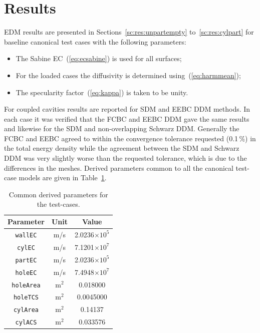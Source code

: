 \documentclass[a4paper]{article}
\numberwithin{equation}{section}
\newcounter{Table}
\begin{document}
\section[Results]{Results}
\label{sc:res}

EDM results are presented in Sections~\ref{sc:res:unpartempty} to~\ref{sc:res:cylpart} for baseline canonical 
test cases with the following parameters:
\begin{itemize}
 \item The Sabine EC~(\ref{eq:ecsabine}) is used for all surfaces;
 \item For the loaded cases the diffusivity is determined using~(\ref{eq:harmmean});
 \item The specularity factor~(\ref{eq:kappa}) is taken to be unity.
\end{itemize}
For coupled cavities results are reported for SDM and EEBC DDM methods. In each case it was verified
that the FCBC and EEBC DDM gave the same results and likewise for the SDM and non-overlapping Schwarz
DDM. Generally the FCBC and EEBC agreed to within the convergence tolerance requested (0.1\,\%) in the 
total energy density while the agreement between the SDM and Schwarz DDM was very slightly worse than
the requested tolerance, which is due to the differences in the meshes. Derived parameters common 
to all the canonical test-case models are given in Table~\ref{tb:derivparams}.

\begin{table}[ht]
\begin{center}
\begin{tabular}{|c|c|c|}
\hline
\textbf{Parameter}     &\textbf{Unit} &\textbf{Value}\\ 
\hline
\texttt{wallEC}        &m/s           &2.0236$\times 10^5$ \\
\texttt{cylEC}         &m/s           &7.1201$\times 10^7$ \\
\texttt{partEC}        &m/s           &2.0236$\times 10^5$ \\
\texttt{holeEC}        &m/s           &7.4948$\times 10^7$ \\
\texttt{holeArea}      &m$^2$         &0.018000            \\
\texttt{holeTCS}       &m$^2$         &0.0045000           \\
\texttt{cylArea}       &m$^2$         &0.14137             \\
\texttt{cylACS}        &m$^2$         &0.033576            \\
\hline
\end{tabular}
\end{center}
\caption{\label{tb:derivparams} Common derived parameters for the test-cases.}
\end{table}
\end{document}

